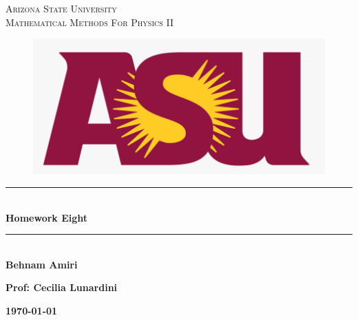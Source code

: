 \documentclass[fleqn]{article}
\begin{document}
  \begin{titlepage}

    \newcommand{\HRule}{\rule{\linewidth}{0.5mm}}

    \center



    \textsc{\LARGE Arizona State University}\\[1.5cm]

    \textsc{\LARGE Mathematical Methods For Physics II }\\[1.5cm] 


    \begin{figure}
      \includegraphics[width=\linewidth]{asu.png}
    \end{figure}


    \HRule \\[0.4cm]
    { \huge \bfseries Homework Eight}\\[0.4cm] 
    \HRule \\[1.5cm]

    \textbf{Behnam Amiri}

    \bigbreak

    \textbf{Prof: Cecilia Lunardini}

    \bigbreak


    \textbf{{\large \today}\\[2cm]}

    \vfill

  \end{titlepage}
\end{document}
